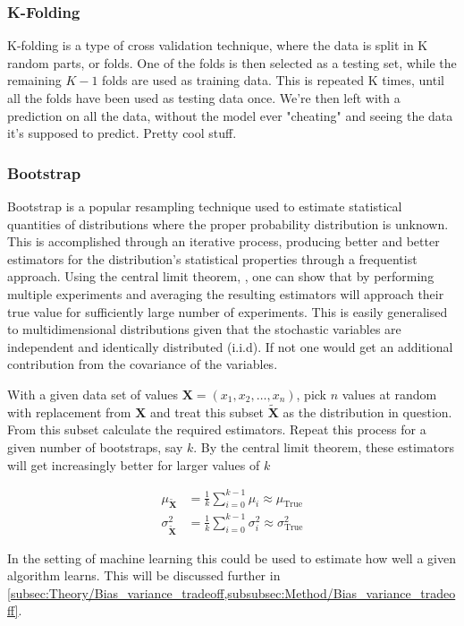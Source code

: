 \documentclass[10pt, twocolumn]{article}
\providecommand{\bmt}[1]
{
\ensuremath{\bm{\tilde{#1}}}
}
\begin{document}
\subsubsection{K-Folding}
\label{subsubsec:kfold_method}
K-folding is a type of cross validation technique, where the data is split in K random parts, or folds. One of the folds is then selected as a testing set, while the remaining $K-1$ folds are used as training data. This is repeated K times, until all the folds have been used as testing data once. We're then left with a prediction on all the data, without the model ever "cheating" and seeing the data it's supposed to predict. Pretty cool stuff.


\subsubsection{Bootstrap}
\label{subsubsec:Theory/Boostrap}
Bootstrap is a popular resampling technique used to estimate statistical quantities of distributions where the proper probability distribution is unknown. This is accomplished through an iterative process, producing better and better estimators for the distribution's statistical properties through a frequentist approach. Using the central limit theorem, \citep{STK1100_boka}, one can show that by performing multiple experiments and averaging the resulting estimators will approach their true value for sufficiently large number of experiments. This is easily generalised to multidimensional distributions given that the stochastic variables are independent and identically distributed (i.i.d). If not one would get an additional contribution from the covariance of the variables.

With a given data set of values $\bm{X} = \left(x_1,x_2,\ldots,x_n\right)$, pick $n$ values at random with replacement from $\bm{X}$ and treat this subset $\bmt{X}$ as the distribution in question. From this subset calculate the required estimators. Repeat this process for a given number of bootstraps, say $k$. By the central limit theorem, these estimators will get increasingly better for larger values of $k$

\begin{align*}
    \mu_{\bmt{X}} &= \frac{1}{k}\sum_{i=0}^{k-1}\mu_i \approx \mu_{\text{True}}
    \\
    \sigma_{\bmt{X}}^2 &= \frac{1}{k}\sum_{i=0}^{k-1}\sigma_i^2 \approx \sigma_{\text{True}}^2
\end{align*}

In the setting of machine learning this could be used to estimate how well a given algorithm learns. This will be discussed further in \cref{subsec:Theory/Bias_variance_tradeoff,subsubsec:Method/Bias_variance_tradeoff}.
\end{document}
